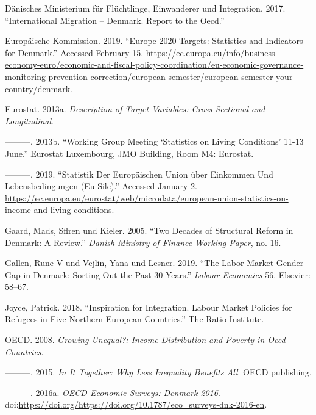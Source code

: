 \documentclass[12pt,]{article}
\begin{document}
\hypertarget{ref-integr}{}
Dänisches Ministerium für Flüchtlinge, Einwanderer und Integration.
2017. ``International Migration -- Denmark. Report to the Oecd.''

\hypertarget{ref-eudenm}{}
Europäische Kommission. 2019. ``Europe 2020 Targets: Statistics and
Indicators for Denmark.'' Accessed February 15.
\url{https://ec.europa.eu/info/business-economy-euro/economic-and-fiscal-policy-coordination/eu-economic-governance-monitoring-prevention-correction/european-semester/european-semester-your-country/denmark}.

\hypertarget{ref-silcmanual}{}
Eurostat. 2013a. \emph{Description of Target Variables: Cross-Sectional
and Longitudinal}.

\hypertarget{ref-cawi}{}
---------. 2013b. ``Working Group Meeting `Statistics on Living
Conditions' 11-13 June.'' Eurostat Luxembourg, JMO Building, Room M4:
Eurostat.

\hypertarget{ref-eurostatweb}{}
---------. 2019. ``Statistik Der Europäischen Union über Einkommen Und
Lebensbedingungen (Eu-Silc).'' Accessed January 2.
\url{https://ec.europa.eu/eurostat/web/microdata/european-union-statistics-on-income-and-living-conditions}.

\hypertarget{ref-gaard2005two}{}
Gaard, Mads, Sflren und Kieler. 2005. ``Two Decades of Structural Reform
in Denmark: A Review.'' \emph{Danish Ministry of Finance Working Paper},
no. 16.

\hypertarget{ref-gallen2019labor}{}
Gallen, Rune V und Vejlin, Yana und Lesner. 2019. ``The Labor Market
Gender Gap in Denmark: Sorting Out the Past 30 Years.'' \emph{Labour
Economics} 56. Elsevier: 58--67.

\hypertarget{ref-joyce2018inspiration}{}
Joyce, Patrick. 2018. ``Inspiration for Integration. Labour Market
Policies for Refugees in Five Northern European Countries.'' The Ratio
Institute.

\hypertarget{ref-oecd2008growing}{}
OECD. 2008. \emph{Growing Unequal?: Income Distribution and Poverty in
Oecd Countries}.

\hypertarget{ref-oecd2015together}{}
---------. 2015. \emph{In It Together: Why Less Inequality Benefits
All}. OECD publishing.

\hypertarget{ref-oecd2016survey}{}
---------. 2016a. \emph{OECD Economic Surveys: Denmark 2016}.
doi:\href{https://doi.org/https://doi.org/https://doi.org/10.1787/eco_surveys-dnk-2016-en}{https://doi.org/https://doi.org/10.1787/eco\_surveys-dnk-2016-en}.
\end{document}

